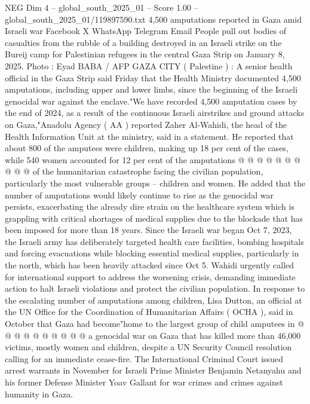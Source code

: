 \begin{textsample}{NEG Dim 4 – global\_south\_2025\_01 – Score 1.00 – global\_south\_2025\_01/119897590.txt}  \label{ex:f4_neg_450}
4,500 amputations reported in Gaza amid Israeli war Facebook X WhatsApp Telegram Email People pull out bodies of casualties from the rubble of a building destroyed in an Israeli strike on the Bureij camp for Palestinian refugees in the central Gaza Strip on January 8, 2025.
Photo : Eyad BABA / AFP GAZA CITY ( Palestine ) : A senior health official in the Gaza Strip said Friday that the Health Ministry documented 4,500 amputations, including upper and lower limbs, since the beginning of the Israeli genocidal war against the enclave."We have recorded 4,500 amputation cases by the end of 2024, as a result of the continuous Israeli airstrikes and ground attacks on Gaza,"Anadolu Agency ( AA ) reported Zaher Al-Wahidi, the head of the Health Information Unit at the ministry, said in a statement.
He reported that about 800 of the amputees were children, making up 18 per cent of the cases, while 540 women accounted for 12 per cent of the amputations @ @ @ @ @ @ @ @ @ @ of the humanitarian catastrophe facing the civilian population, particularly the most vulnerable groups -- children and women.
He added that the number of amputations would likely continue to rise as the genocidal war persists, exacerbating the already dire strain on the healthcare system which is grappling with critical shortages of medical supplies due to the blockade that has been imposed for more than 18 years.
Since the Israeli war began Oct 7, 2023, the Israeli army has deliberately targeted health care facilities, bombing hospitals and forcing evacuations while blocking essential medical supplies, particularly in the north, which has been heavily attacked since Oct 5.
Wahidi urgently called for international support to address the worsening crisis, demanding immediate action to halt Israeli violations and protect the civilian population.
In response to the escalating number of amputations among children, Lisa Dutton, an official at the UN Office for the Coordination of Humanitarian Affairs ( OCHA ), said in October that Gaza had become"home to the largest group of child amputees in @ @ @ @ @ @ @ @ @ @ a genocidal war on Gaza that has killed more than 46,000 victims, mostly women and children, despite a UN Security Council resolution calling for an immediate cease-fire.
The International Criminal Court issued arrest warrants in November for Israeli Prime Minister Benjamin Netanyahu and his former Defense Minister Yoav Gallant for war crimes and crimes against humanity in Gaza.

\end{textsample}
